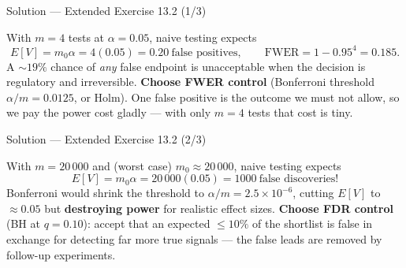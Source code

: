 \documentclass[aspectratio=169,11pt]{beamer}
\begin{document}
\begin{frame}{Solution --- Extended Exercise 13.2 (1/3)}
\begin{solutionbox}
  With $m=4$ tests at $\alpha=0.05$, naive testing expects
  \[
    E[V]=m_0\alpha=4(0.05)=0.20\ \text{false positives},\qquad
    \mathrm{FWER}=1-0.95^4=0.185 .
  \]
  A $\sim$$19\%$ chance of \emph{any} false endpoint is unacceptable when the decision is
  regulatory and irreversible. \textbf{Choose FWER control} (Bonferroni threshold
  $\alpha/m=0.0125$, or Holm). One false positive is the outcome we must not allow, so we
  pay the power cost gladly --- with only $m=4$ tests that cost is tiny.
\end{solutionbox}
\end{frame}

\begin{frame}{Solution --- Extended Exercise 13.2 (2/3)}
\begin{solutionbox}
  With $m=20\,000$ and (worst case) $m_0\approx20\,000$, naive testing expects
  \[
    E[V]=m_0\alpha=20\,000(0.05)=1000\ \text{false discoveries!}
  \]
  Bonferroni would shrink the threshold to $\alpha/m=2.5\times10^{-6}$, cutting $E[V]$ to
  $\approx0.05$ but \textbf{destroying power} for realistic effect sizes. \textbf{Choose
  FDR control} (BH at $q=0.10$): accept that an expected $\le 10\%$ of the shortlist is
  false in exchange for detecting far more true signals --- the false leads are removed by
  follow-up experiments.
\end{solutionbox}
\end{frame}
\end{document}
